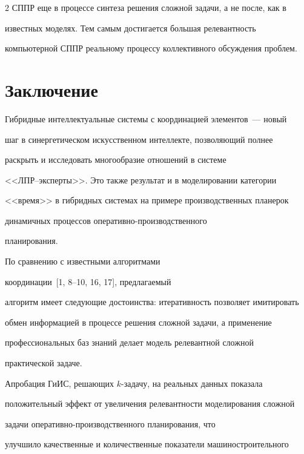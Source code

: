 \begin{multicols}{2}
СППР еще в процессе синтеза решения сложной задачи, а не после, как в 


известных моделях. Тем самым достигается большая релевантность 


компьютерной \mbox{СППР} реальному процессу коллективного обсуж\-де\-ния \mbox{проблем}.


  


\section{Заключение}


  


  Гибридные интеллектуальные системы с координацией элементов~--- новый 


шаг в синергетическом искусственном интеллекте, позволяющий полнее 


раскрыть и исследовать многообразие отношений в системе 


  <<ЛПР--экс\-пер\-ты>>. Это также результат и в моделировании категории 


<<время>> в гибридных системах на примере производственных планерок 


динамичных процессов опе\-ра\-тив\-но-про\-из\-вод\-ст\-вен\-но\-го 


планирования.


  


  По сравнению с известными алгоритмами 


  координации~[1, 8--10, 16, 17], предлагаемый 


алгоритм имеет следующие достоинства: итеративность позволяет имитировать 


обмен информацией в процессе решения сложной задачи, а применение 


профессиональных баз знаний делает модель релевантной сложной 


практической задаче.


  


  Апробация ГиИС, решающих $k$-задачу, на реальных данных показала 


положительный эффект от увеличения релевантности моделирования сложной 


задачи опе\-ра\-тив\-но-про\-из\-вод\-ст\-вен\-но\-го пла\-нирования, что 


улучшило качественные и ко\-личественные показатели машиностроительного\linebreak 



\end{multicols}
